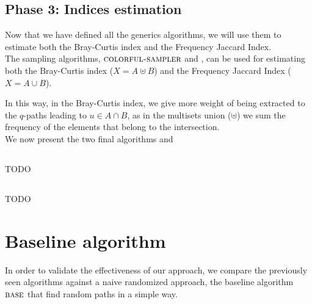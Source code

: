 \clearpage

\subsection*{Phase 3: Indices estimation}

Now that we have defined all the generics algorithms, 
we will use them to estimate both the Bray-Curtis index and the Frequency Jaccard Index.\\

The sampling algorithms, $\textsc{colorful-sampler}$ and \fsamp, can be used for estimating both the Bray-Curtis index ($X = A \uplus B$) and
the Frequency Jaccard Index ($X = A \cup B$).

In this way, in the Bray-Curtis index, we give more weight of being extracted to the $q$-paths leading to $u \in A \cap B$,
as in the multisets union ($\uplus$) we sum the frequency of the elements that belong to the intersection.\\

We now present the two final algorithms \fcount and \fsamp

\subsection*{\fcount}

TODO

\subsection*{\fsamp}

TODO 

\clearpage
\section{Baseline algorithm}

In order to validate the effectiveness of our approach, we compare the previously seen algorithms against a naive randomized approach,
the baseline algorithm $\textsc{base}$ that find random paths in a simple way.


